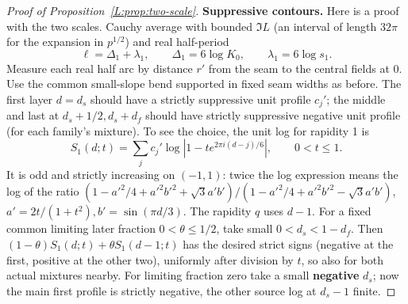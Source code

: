 \documentclass[11pt]{article}
\numberwithin{equation}{section}
\theoremstyle{definition}\newtheorem{definition}[theorem]{Definition}
\theoremstyle{remark}\newtheorem{remark}[theorem]{Remark}
\begin{document}
\begin{proof}[Proof of Proposition~\ref{L:prop:two-scale}]
\textbf{Suppressive contours.}
Here is a proof with the two scales. Cauchy average with bounded \(\Im L\) (an interval of length \(32\pi\) for the expansion in \(p^{1/2}\)) and real half-period
\[
 \ell=\Delta_1+\lambda_1,\qquad \Delta_1=6\log K_0,\qquad \lambda_1=6\log s_1.
\]
Measure each real half arc by distance \(r'\) from the seam to the central fields at 0. Use the common small-slope bend supported in fixed seam widths as before. The first layer \(d=d_s\) should have a strictly suppressive unit profile \(c_j'\); the middle and last at \(d_s+1/2,d_s+d_f\) should have strictly suppressive negative unit profile (for each family's mixture). To see the choice, the unit log for rapidity 1 is
\[
 S_1(d;t)=\sum_j c_j'\log|1-t e^{2\pi i(d-j)/6}|,\qquad 0<t\le1 .
\]
It is odd and strictly increasing on \((-1,1)\): twice the log expression means the log of the ratio \((1-a'^2/4+a'^2 b'^2+\sqrt3 a'b')/(1-a'^2/4+a'^2 b'^2-\sqrt3 a'b')\), \(a'=2t/(1+t^2), b'=\sin(\pi d/3)\). The rapidity \(q\) uses \(d-1\). For a fixed common limiting later fraction \(0<\theta\le1/2\), take small \(0<d_s<1-d_f\). Then \((1-\theta)S_1(d;t)+\theta S_1(d-1;t)\) has the desired strict signs (negative at the first, positive at the other two), uniformly after division by \(t\), so also for both actual mixtures nearby. For limiting fraction zero take a small \textbf{negative} \(d_s\); now the main first profile is strictly negative, the other source log at \(d_s-1\) finite.


\end{proof}
\end{document}
